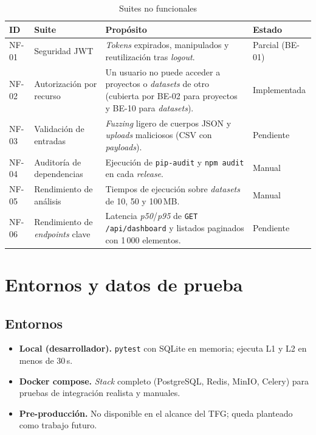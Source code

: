 \begin{table}[H]
  \centering
  \small
  \caption{Suites no funcionales}
  \label{tab:suites-nofuncionales}
  \begin{tabularx}{\textwidth}{l >{\hsize=0.7\hsize}X >{\hsize=1.3\hsize}X l}
    \toprule
    \textbf{ID} & \textbf{Suite} & \textbf{Propósito} & \textbf{Estado} \\
    \midrule
    NF-01 & Seguridad \acs{JWT} &
      \emph{Tokens} expirados, manipulados y reutilización tras
      \emph{logout}.
      & Parcial (BE-01) \\
    NF-02 & Autorización por recurso &
      Un usuario no puede acceder a proyectos o \emph{datasets} de otro
      (cubierta por BE-02 para proyectos y BE-10 para \emph{datasets}).
      & Implementada \\
    NF-03 & Validación de entradas &
      \emph{Fuzzing} ligero de cuerpos \acs{JSON} y \emph{uploads}
      maliciosos (\acs{CSV} con \emph{payloads}).
      & Pendiente \\
    NF-04 & Auditoría de dependencias &
      Ejecución de \texttt{pip-audit} y \texttt{npm audit} en cada
      \emph{release}.
      & Manual \\
    NF-05 & Rendimiento de análisis &
      Tiempos de ejecución sobre \emph{datasets} de 10, 50 y 100\,\acs{MB}.
      & Manual \\
    NF-06 & Rendimiento de \emph{endpoints} clave &
      Latencia \emph{p50}/\emph{p95} de \texttt{GET /api/dashboard} y
      listados paginados con 1\,000 elementos.
      & Pendiente \\
  \bottomrule
  \end{tabularx}
\end{table}


\section{Entornos y datos de prueba}
\label{sec:anx-pruebas-entornos}

\subsection*{Entornos}
\begin{itemize}
  \item \textbf{Local (desarrollador).}  \texttt{pytest} con SQLite en
        memoria; ejecuta L1 y L2 en menos de 30\,s.
  \item \textbf{Docker compose.}  \emph{Stack} completo (PostgreSQL,
        Redis, MinIO, Celery) para pruebas de integración
        realista y manuales.
  \item \textbf{Pre-producción.}  No disponible en el alcance del
        \acs{TFG}; queda planteado como trabajo futuro.
\end{itemize}

